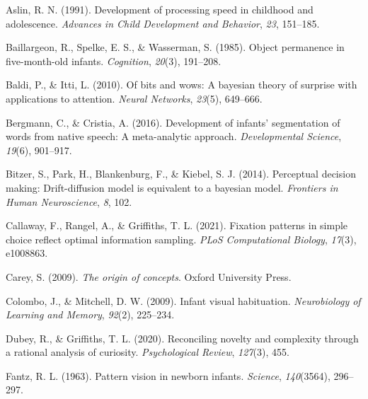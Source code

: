 \documentclass[10pt, letterpaper]{article}
\newenvironment{CSLReferences}%
  {}%
  {\par}
\begin{document}
\hypertarget{refs}{}
\begin{CSLReferences}{1}{0}
\leavevmode{}%
Aslin, R. N. (1991). Development of processing speed in childhood and
adolescence. \emph{Advances in Child Development and Behavior},
\emph{23}, 151--185.

\leavevmode{}%
Baillargeon, R., Spelke, E. S., \& Wasserman, S. (1985). Object
permanence in five-month-old infants. \emph{Cognition}, \emph{20}(3),
191--208.

\leavevmode{}%
Baldi, P., \& Itti, L. (2010). Of bits and wows: A bayesian theory of
surprise with applications to attention. \emph{Neural Networks},
\emph{23}(5), 649--666.

\leavevmode{}%
Bergmann, C., \& Cristia, A. (2016). Development of infants'
segmentation of words from native speech: A meta-analytic approach.
\emph{Developmental Science}, \emph{19}(6), 901--917.

\leavevmode{}%
Bitzer, S., Park, H., Blankenburg, F., \& Kiebel, S. J. (2014).
Perceptual decision making: Drift-diffusion model is equivalent to a
bayesian model. \emph{Frontiers in Human Neuroscience}, \emph{8}, 102.

\leavevmode{}%
Callaway, F., Rangel, A., \& Griffiths, T. L. (2021). Fixation patterns
in simple choice reflect optimal information sampling. \emph{PLoS
Computational Biology}, \emph{17}(3), e1008863.

\leavevmode{}%
Carey, S. (2009). \emph{The origin of concepts}. Oxford University
Press.

\leavevmode{}%
Colombo, J., \& Mitchell, D. W. (2009). Infant visual habituation.
\emph{Neurobiology of Learning and Memory}, \emph{92}(2), 225--234.

\leavevmode{}%
Dubey, R., \& Griffiths, T. L. (2020). Reconciling novelty and
complexity through a rational analysis of curiosity. \emph{Psychological
Review}, \emph{127}(3), 455.

\leavevmode{}%
Fantz, R. L. (1963). Pattern vision in newborn infants. \emph{Science},
\emph{140}(3564), 296--297.


\end{CSLReferences}
\end{document}
